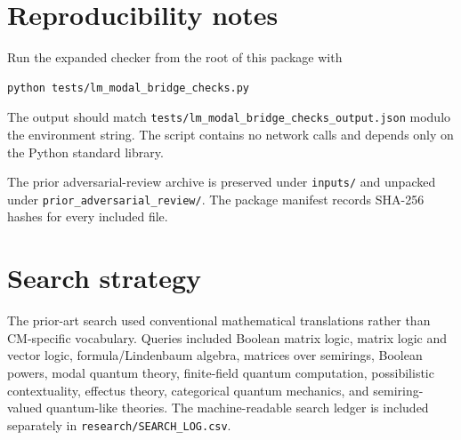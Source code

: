 \documentclass[11pt]{article}
\theoremstyle{definition}
\begin{document}
\appendix
\section{Reproducibility notes}

Run the expanded checker from the root of this package with
\begin{lstlisting}[language=bash]
python tests/lm_modal_bridge_checks.py
\end{lstlisting}
The output should match \texttt{tests/lm\_modal\_bridge\_checks\_output.json} modulo the environment
string. The script contains no network calls and depends only on the Python standard library.

The prior adversarial-review archive is preserved under \texttt{inputs/} and unpacked under
\texttt{prior\_adversarial\_review/}. The package manifest records SHA-256 hashes for every included
file.

\section{Search strategy}

The prior-art search used conventional mathematical translations rather than CM-specific vocabulary.
Queries included Boolean matrix logic, matrix logic and vector logic, formula/Lindenbaum algebra,
matrices over semirings, Boolean powers, modal quantum theory, finite-field quantum computation,
possibilistic contextuality, effectus theory, categorical quantum mechanics, and semiring-valued
quantum-like theories. The machine-readable search ledger is included separately in
\texttt{research/SEARCH\_LOG.csv}.
\end{document}
